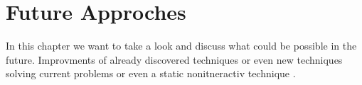 \chapter{Future Approches}

In this chapter we want to take a look and discuss what could be possible in the future. Improvments of already discovered techniques or even new techniques solving current problems or even a static nonitneractiv  technique \cite{zhao2006sniafl}.

